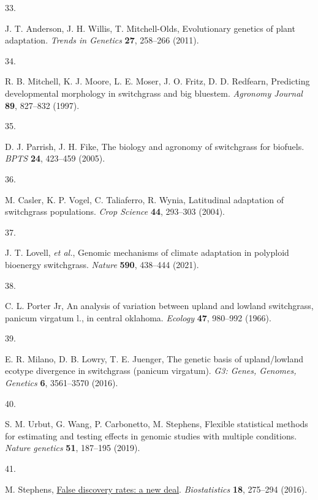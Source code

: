 \documentclass[
  9pt,
  twocolumn,
  twoside]{pnas-new}
\newlength{\cslhangindent}
\newlength{\csllabelwidth}
\newenvironment{CSLReferences}[2] %
 {\begin{list}{}{%
  \setlength{\itemindent}{0pt}
  \setlength{\leftmargin}{0pt}
  \setlength{\parsep}{0pt}
  \ifodd #1
   \setlength{\leftmargin}{\cslhangindent}
   \setlength{\itemindent}{-1\cslhangindent}
  \fi
  \setlength{\itemsep}{#2\baselineskip}}}
 {\end{list}}
\newcommand{\CSLLeftMargin}[1]{\parbox[t]{\csllabelwidth}{\strut#1\strut}}
\newcommand{\CSLRightInline}[1]{\parbox[t]{\linewidth - \csllabelwidth}{\strut#1\strut}}
\begin{document}
\begin{CSLReferences}{0}{1}
\CSLLeftMargin{33. }%
\CSLRightInline{J. T. Anderson, J. H. Willis, T. Mitchell-Olds,
Evolutionary genetics of plant adaptation. \emph{Trends in Genetics}
\textbf{27}, 258--266 (2011).}

\CSLLeftMargin{34. }%
\CSLRightInline{R. B. Mitchell, K. J. Moore, L. E. Moser, J. O. Fritz,
D. D. Redfearn, Predicting developmental morphology in switchgrass and
big bluestem. \emph{Agronomy Journal} \textbf{89}, 827--832 (1997).}

\CSLLeftMargin{35. }%
\CSLRightInline{D. J. Parrish, J. H. Fike, The biology and agronomy of
switchgrass for biofuels. \emph{BPTS} \textbf{24}, 423--459 (2005).}

\CSLLeftMargin{36. }%
\CSLRightInline{M. Casler, K. P. Vogel, C. Taliaferro, R. Wynia,
Latitudinal adaptation of switchgrass populations. \emph{Crop Science}
\textbf{44}, 293--303 (2004).}

\CSLLeftMargin{37. }%
\CSLRightInline{J. T. Lovell, \emph{et al.}, Genomic mechanisms of
climate adaptation in polyploid bioenergy switchgrass. \emph{Nature}
\textbf{590}, 438--444 (2021).}

\CSLLeftMargin{38. }%
\CSLRightInline{C. L. Porter Jr, An analysis of variation between upland
and lowland switchgrass, panicum virgatum l., in central oklahoma.
\emph{Ecology} \textbf{47}, 980--992 (1966).}

\CSLLeftMargin{39. }%
\CSLRightInline{E. R. Milano, D. B. Lowry, T. E. Juenger, The genetic
basis of upland/lowland ecotype divergence in switchgrass (panicum
virgatum). \emph{G3: Genes, Genomes, Genetics} \textbf{6}, 3561--3570
(2016).}

\CSLLeftMargin{40. }%
\CSLRightInline{S. M. Urbut, G. Wang, P. Carbonetto, M. Stephens,
Flexible statistical methods for estimating and testing effects in
genomic studies with multiple conditions. \emph{Nature genetics}
\textbf{51}, 187--195 (2019).}

\CSLLeftMargin{41. }%
\CSLRightInline{M. Stephens,
\href{https://doi.org/10.1093/biostatistics/kxw041}{{False discovery
rates: a new deal}}. \emph{Biostatistics} \textbf{18}, 275--294 (2016).}


\end{CSLReferences}
\end{document}
